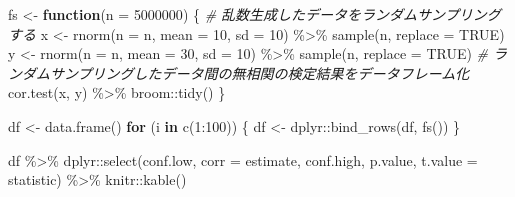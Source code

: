 \documentclass[]{tufte-handout}
\newenvironment{Shaded}{}{}
\newcommand{\AttributeTok}[1]{\textcolor[rgb]{0.49,0.56,0.16}{#1}}
\newcommand{\CommentTok}[1]{\textcolor[rgb]{0.38,0.63,0.69}{\textit{#1}}}
\newcommand{\ConstantTok}[1]{\textcolor[rgb]{0.53,0.00,0.00}{#1}}
\newcommand{\ControlFlowTok}[1]{\textcolor[rgb]{0.00,0.44,0.13}{\textbf{#1}}}
\newcommand{\DecValTok}[1]{\textcolor[rgb]{0.25,0.63,0.44}{#1}}
\newcommand{\FunctionTok}[1]{\textcolor[rgb]{0.02,0.16,0.49}{#1}}
\newcommand{\NormalTok}[1]{#1}
\newcommand{\OtherTok}[1]{\textcolor[rgb]{0.00,0.44,0.13}{#1}}
\newcommand{\SpecialCharTok}[1]{\textcolor[rgb]{0.25,0.44,0.63}{#1}}
\begin{document}
\begin{Shaded}
\begin{Highlighting}[numbers=left,,]
\NormalTok{fs }\OtherTok{\textless{}{-}} \ControlFlowTok{function}\NormalTok{(}\AttributeTok{n =} \DecValTok{5000000}\NormalTok{) \{}
  \CommentTok{\# 乱数生成したデータをランダムサンプリングする}
\NormalTok{  x }\OtherTok{\textless{}{-}} \FunctionTok{rnorm}\NormalTok{(}\AttributeTok{n =}\NormalTok{ n, }\AttributeTok{mean =} \DecValTok{10}\NormalTok{, }\AttributeTok{sd =} \DecValTok{10}\NormalTok{) }\SpecialCharTok{\%\textgreater{}\%} \FunctionTok{sample}\NormalTok{(n, }\AttributeTok{replace =} \ConstantTok{TRUE}\NormalTok{)}
\NormalTok{  y }\OtherTok{\textless{}{-}} \FunctionTok{rnorm}\NormalTok{(}\AttributeTok{n =}\NormalTok{ n, }\AttributeTok{mean =} \DecValTok{30}\NormalTok{, }\AttributeTok{sd =} \DecValTok{10}\NormalTok{) }\SpecialCharTok{\%\textgreater{}\%} \FunctionTok{sample}\NormalTok{(n, }\AttributeTok{replace =} \ConstantTok{TRUE}\NormalTok{)}
  \CommentTok{\# ランダムサンプリングしたデータ間の無相関の検定結果をデータフレーム化}
  \FunctionTok{cor.test}\NormalTok{(x, y) }\SpecialCharTok{\%\textgreater{}\%}\NormalTok{ broom}\SpecialCharTok{::}\FunctionTok{tidy}\NormalTok{()}
\NormalTok{\}}

\NormalTok{df }\OtherTok{\textless{}{-}} \FunctionTok{data.frame}\NormalTok{()}
\ControlFlowTok{for}\NormalTok{ (i }\ControlFlowTok{in} \FunctionTok{c}\NormalTok{(}\DecValTok{1}\SpecialCharTok{:}\DecValTok{100}\NormalTok{)) \{}
\NormalTok{  df }\OtherTok{\textless{}{-}}\NormalTok{ dplyr}\SpecialCharTok{::}\FunctionTok{bind\_rows}\NormalTok{(df, }\FunctionTok{fs}\NormalTok{())}
\NormalTok{\}}

\NormalTok{df }\SpecialCharTok{\%\textgreater{}\%} 
\NormalTok{  dplyr}\SpecialCharTok{::}\FunctionTok{select}\NormalTok{(conf.low, }\AttributeTok{corr =}\NormalTok{ estimate, conf.high,}
\NormalTok{                p.value, }\AttributeTok{t.value =}\NormalTok{ statistic) }\SpecialCharTok{\%\textgreater{}\%} 
\NormalTok{  knitr}\SpecialCharTok{::}\FunctionTok{kable}\NormalTok{()}
\end{Highlighting}
\end{Shaded}
\end{document}
